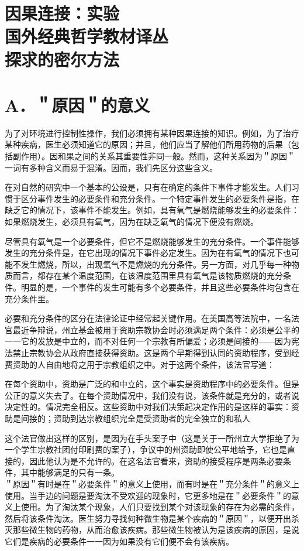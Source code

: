 \section*{因果连接：实验 \\
 国外经典哲学教材译丛 \\
 探求的密尔方法 }


\section*{A．＂原因＂的意义}
为了对环境进行控制性操作，我们必须拥有某种因果连接的知识。例如，为了治疗某种疾病，医生必须知道它的原因；并且，他们应当了解他们所用药物的后果（包括副作用）。因和果之间的关系其重要性非同一般。然而，这种关系因为＂原因＂一词有多种含义而易于混淆。因而，我们先区分这些含义。

在对自然的研究中一个基本的公设是，只有在确定的条件下事件才能发生。人们习惯于区分事件发生的必要条件和充分条件。一个特定事件发生的必要条件是指，在缺乏它的情况下，该事件不能发生。例如，具有氧气是燃烧能够发生的必要条件：如果燃烧发生，必须具有氧气，因为在缺乏氧气的情况下便没有燃烧。

尽管具有氧气是一个必要条件，但它不是燃烧能够发生的充分条件。一个事件能够发生的充分条件是，在它出现的情况下事件必定发生。因为在有氧气的情况下也可能不发生燃烧，所以，出现氧气不是燃烧的充分条件。另一方面，对几乎每一种物质而言，都存在某个温度范围，在该温度范围里具有氧气是该物质燃烧的充分条件。明显的是，一个事件的发生可能有多个必要条件，并且这些必要条件均包含在充分条件里。

必要和充分条件的区分在法律论证中经常起关键作用。在美国高等法院中，一名法官最近争辩说，州立基金被用于资助宗教协会时必须满足两个条件：必须是公平的一一它的发放是中立的，而不对任何一个宗教有所偏爱；必须是间接的——因为宪法禁止宗教协会从政府直接获得资助。这是两个早期得到认同的资助程序，受到经费资助的人自由地将之用于宗教组织之中。对于这两个条件，该法官写道：

在每个资助中，资助是广泛的和中立的，这个事实是资助程序中的必要条件。但是公正的意义失去了。在每个资助情况中，我们没有说，该条件就是充分的，或者说决定性的。情况完全相反。这些资助中对我们决策起决定作用的是这样的事实：资助是间接的；资助到达宗教组织完全是受资助者的完全独立的和私人

这个法官做出这样的区别，是因为在手头案子中（这是关于一所州立大学拒绝了为一个学生宗教社团付印刷费的案子），争议中的州资助即使公平地给予，它也是直接的，因此他认为是不允许的。在这名法官看来，资助的接受程序是两条必要条件，其中能够满足的只有一条。\\
＂原因＂有时是在＂必要条件＂的意义上使用，而有时是在＂充分条件＂的意义上使用。当手边的问题是要淘汰不受欢迎的现象时，它更多地是在＂必要条件＂的意义上使用。为了淘汰某个现象，人们只要找到某个对该现象的存在为必需的条件，然后将该条件淘汰。医生努力寻找何种微生物是某个疾病的＂原因＂，以便开出杀灭那些微生物的药物，从而治愈该疾病。那些微生物被认为是该疾病的原因，是说它们是疾病的必要条件一一因为如果没有它们便不会有该疾病。

